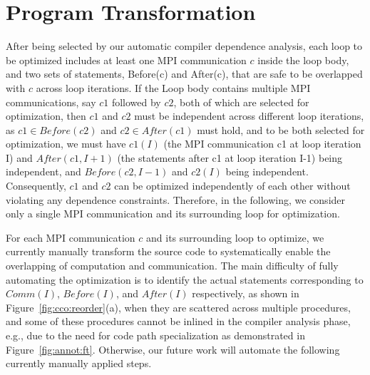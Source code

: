 \section{Program Transformation}
\label{sec-opt}

After being selected by our automatic compiler dependence analysis, each loop 
to be optimized includes at least one MPI communication $c$ inside the loop body, and two sets of statements, 
Before(c) and After(c), that are safe to be overlapped with $c$ across loop iterations. If the Loop body contains 
multiple MPI communications, say $c1$ followed by $c2$, both of which are selected for optimization, then $c1$ and $c2$
must be independent across different loop iterations, as $c1 \in Before(c2)$ and $c2 \in After(c1)$ must hold, and to be
both selected  for optimization, we must have $c1(I)$ (the MPI communication c1 at loop iteration I) and $After(c1,I+1)$ (the statements after c1 at loop iteration I-1) being independent, and $Before(c2,I-1)$ and $c2(I)$ being independent. 
Consequently, $c1$ and $c2$ can be optimized independently of each other without violating any dependence constraints. Therefore, in the following, we consider only a single MPI communication and its surrounding loop for optimization. 

For each MPI communication $c$ and its surrounding loop to optimize, we currently manually
transform the source code to systematically enable the overlapping of
computation and communication. The main difficulty of fully automating the optimization is to identify the 
actual statements corresponding to $Comm(I)$, $Before(I)$, and $After(I)$ respectively, as shown in Figure~\ref{fig:cco:reorder}(a),
when they are scattered across multiple procedures,  and some of these procedures cannot be inlined in the compiler analysis phase, e.g., due to 
the need for code path specialization as demonstrated in Figure~\ref{fig:annot:ft}. 
Otherwise, our future work will automate the following currently manually applied steps. 


